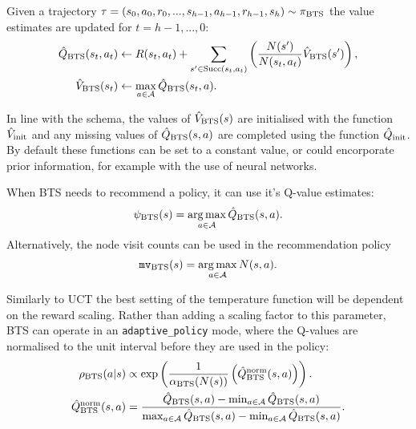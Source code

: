         Given a trajectory $\tau=(s_0,a_0,r_0,...,s_{h-1},a_{h-1},r_{h-1},s_h)\sim{\pi_{{\textnormal{BTS}}}}$ the value estimates are updated for $t=h-1,...,0$:
        \begin{align}
            {\hat{Q}_{{\textnormal{BTS}}}}(s_t,a_t) &\leftarrow 
                R(s_t,a_t) + \sum_{s' \in {\textnormal{Succ}(s_t,a_t)}} \left( \frac{N(s')}{N(s_t,a_t)} {\hat{V}_{{\textnormal{BTS}}}}(s') \right), 
                        \label{eq:4:bts_backup_q} \\ 
            {\hat{V}_{{\textnormal{BTS}}}}(s_t) &\leftarrow \max_{a\in\mathcal{A}} {\hat{Q}_{{\textnormal{BTS}}}}(s_t,a).
                        \label{eq:4:bts_backup_v} 
        \end{align}

        In line with the \thtspp\ewe schema, the values of ${\hat{V}_{{\textnormal{BTS}}}}(s)$ are initialised with the function ${\hat{V}_{\textnormal{init}}}$ and any missing values of ${\hat{Q}_{{\textnormal{BTS}}}}(s,a)$ are completed using the function ${\hat{Q}_{\textnormal{init}}}$. By default these functions can be set to a constant value, or could encorporate prior information, for example with the use of neural networks.
        
        When BTS needs to recommend a policy, it can use it's Q-value estimates:
        \begin{align}
            {\psi_{{\textnormal{BTS}}}}(s)=\operatorname*{arg\,max}_{a\in\mathcal{A}}{\hat{Q}_{{\textnormal{BTS}}}}(s,a). \label{eq:4:psibts}
        \end{align}
        Alternatively, the node visit counts can be used in the recommendation policy
        \begin{align}
            {\textup{\texttt{mv}}_{{\textnormal{BTS}}}}(s) = \operatorname*{arg\,max}_{a\in\mathcal{A}} N(s,a). \label{eq:4:mvbts}
        \end{align}

        \newcommand{\norm}{{\text{norm}}}
        Similarly to UCT the best setting of the temperature function will be dependent on the reward scaling. Rather than adding a scaling factor to this parameter, BTS can operate in an \texttt{adaptive\_policy} mode, where the Q-values are normalised to the unit interval before they are used in the policy:
        \begin{align}
            \rhobts(a|s) &\propto \exp\left(\frac{1}{\alphabts(N(s))}\left(\Qbts^{\norm}(s,a)\right)\right). \\
            \Qbts^{\norm}(s,a) &= 
                \frac{\Qbts(s,a)-\min_{a\in\cl{A}}\Qbts(s,a)}{\max_{a\in\cl{A}}\Qbts(s,a)-\min_{a\in\cl{A}}\Qbts(s,a)}.
        \end{align}


